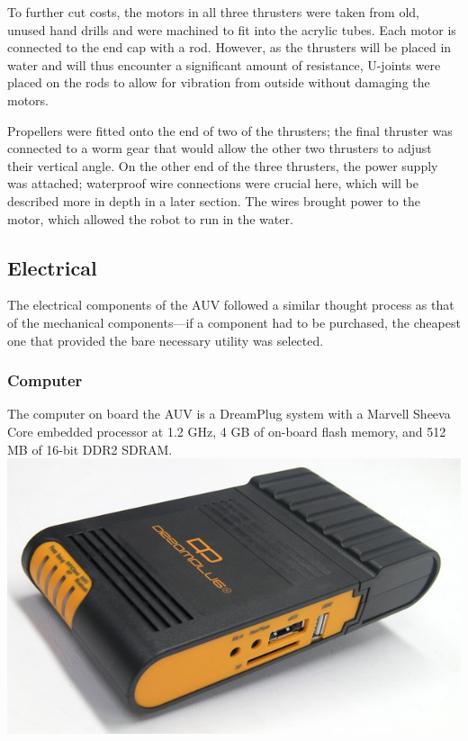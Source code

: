 \documentclass[12pt, letterpaper, twocolumn, titlepage]{article}
\begin{document}
To further cut costs, the motors in all three thrusters were taken from old, unused hand drills and were machined to fit into the acrylic tubes. Each motor is connected to the end cap with a rod. However, as the thrusters will be placed in water and will thus encounter a significant amount of resistance, U-joints were placed on the rods to allow for vibration from outside without damaging the motors.

Propellers were fitted onto the end of two of the thrusters; the final thruster was connected to a worm gear that would allow the other two thrusters to adjust their vertical angle. On the other end of the three thrusters, the power supply was attached; waterproof wire connections were crucial here, which will be described more in depth in a later section. The wires brought power to the motor, which allowed the robot to run in the water.

\subsection{Electrical}

The electrical components of the AUV followed a similar thought process as that of the mechanical components---if a component had to be purchased, the cheapest one that provided the bare necessary utility was selected.

\subsubsection{Computer}

The computer on board the AUV is a DreamPlug system with a Marvell\textregistered{} Sheeva\texttrademark{} Core embedded processor at 1.2 GHz, 4 GB of on-board flash memory, and 512 MB of 16-bit DDR2 SDRAM.\\

\noindent\includegraphics[width=\columnwidth]{Dreamplug}
\end{document}
